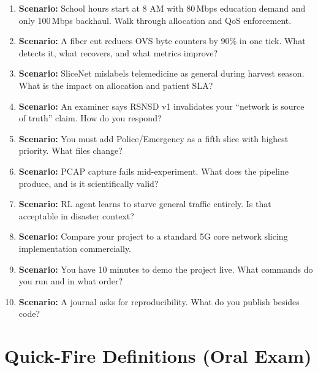 \documentclass[11pt,a4paper]{article}
\begin{document}
\begin{enumerate}
    \item \textbf{Scenario:} School hours start at 8 AM with 80\,Mbps education demand and only 100\,Mbps backhaul. Walk through allocation and QoS enforcement.
    \item \textbf{Scenario:} A fiber cut reduces OVS byte counters by 90\% in one tick. What detects it, what recovers, and what metrics improve?
    \item \textbf{Scenario:} SliceNet mislabels telemedicine as general during harvest season. What is the impact on allocation and patient SLA?
    \item \textbf{Scenario:} An examiner says RSNSD v1 invalidates your ``network is source of truth'' claim. How do you respond?
    \item \textbf{Scenario:} You must add Police/Emergency as a fifth slice with highest priority. What files change?
    \item \textbf{Scenario:} PCAP capture fails mid-experiment. What does the pipeline produce, and is it scientifically valid?
    \item \textbf{Scenario:} RL agent learns to starve general traffic entirely. Is that acceptable in disaster context?
    \item \textbf{Scenario:} Compare your project to a standard 5G core network slicing implementation commercially.
    \item \textbf{Scenario:} You have 10 minutes to demo the project live. What commands do you run and in what order?
    \item \textbf{Scenario:} A journal asks for reproducibility. What do you publish besides code?
\end{enumerate}

\section{Quick-Fire Definitions (Oral Exam)}
\end{document}
